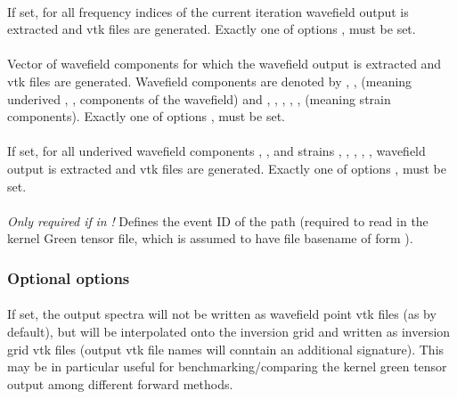 \paragraph{}
If set, for all frequency indices of the current iteration wavefield output is extracted and 
vtk files are generated. Exactly one of options  ,  must be set.
\paragraph{}
Vector of  wavefield components for which the wavefield output is extracted and 
vtk files are generated. 
Wavefield components are denoted by , ,  (meaning underived , , 
 components of the wavefield) and , , , , ,  
(meaning strain components). 
Exactly one of options ,  must be set.
\paragraph{}
If set, for all underived wavefield components , ,  and
strains , , , , ,  wavefield output is extracted and 
vtk files are generated. 
Exactly one of options ,  must be set.
\paragraph{}
\emph{Only required if}  \emph{in}  \emph{!}
Defines the event ID of the path (required to read in the kernel Green tensor file, which is assumed
to have file basename of form ).

\subsubsection{Optional options}
\paragraph{}
If set, the output spectra will not be written as wavefield point vtk files (as by default), but will be 
interpolated onto the inversion grid and written as inversion grid vtk files (output vtk file names will 
conntain an additional  signature). This may be in particular
useful for benchmarking/comparing the kernel green tensor output among different forward methods.
